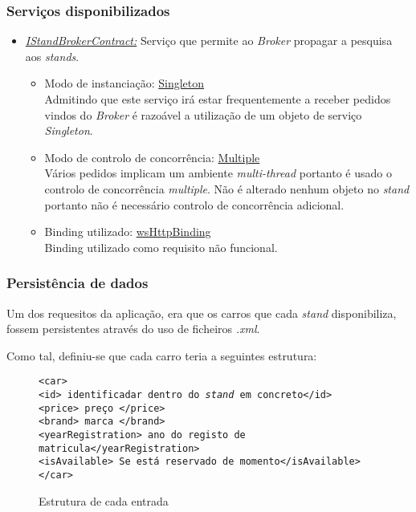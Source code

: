\documentclass[a4paper]{article}
\begin{document}
\subsubsection{Serviços disponibilizados}
\begin{itemize} 

\item
\emph{\underline{IStandBrokerContract:}}
Serviço que permite ao \emph{Broker} propagar a pesquisa aos \emph{stands}.
	\begin{itemize}
		\item
		Modo de instanciação: \underline{Singleton}\\
		Admitindo que este serviço irá estar frequentemente a receber pedidos vindos do \emph{Broker} é razoável a utilização de um objeto de serviço \emph{Singleton}.
		\item
		Modo de controlo de concorrência: \underline{Multiple}\\
		Vários pedidos implicam um ambiente \emph{multi-thread} portanto é usado o controlo de concorrência \emph{multiple}.
		Não é alterado nenhum objeto no \emph{stand} portanto não é necessário controlo de concorrência adicional.
		\item
		Binding utilizado: \underline{wsHttpBinding}\\
		Binding utilizado como requisito não funcional.
	\end{itemize}
\end{itemize}


\subsubsection{Persistência de dados}

Um dos requesitos da aplicação, era que os carros que cada \emph{stand} disponibiliza, fossem persistentes através do uso de ficheiros \emph{.xml}. 

Como tal, definiu-se que cada carro teria a seguintes estrutura:

\begin{figure}[H]
	\begin{framed}
		\texttt{<car> \\
					\hspace*{5mm}<id> identificadar dentro do \emph{stand} em concreto</id> \\
					\hspace*{5mm}<price> preço </price>\\
					\hspace*{5mm}<brand> marca </brand>\\
					\hspace*{5mm}<yearRegistration> ano do registo de matricula</yearRegistration>\\
					\hspace*{5mm}<isAvailable> Se está reservado de momento</isAvailable>\\
			    </car>
		}		
	\end{framed}
	\caption{Estrutura de cada entrada}
  \label{fig:httpHeaderReq}
\end{figure}
\end{document}
